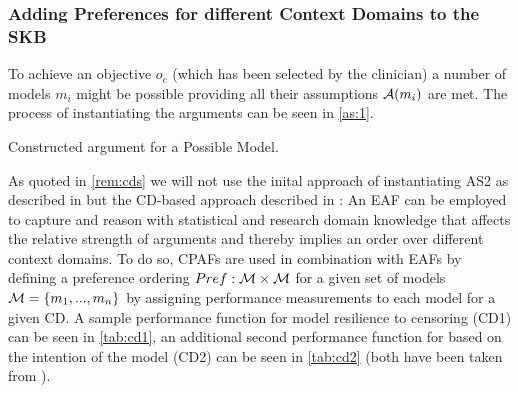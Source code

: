 \subsubsection{Adding Preferences for different Context Domains to the \gls{SKB}}
\label{sub:preferences}

To achieve an objective $o_c$ (which has been selected by the clinician) a number of models $m_i$ might be possible providing all their assumptions $\mathcal{A}(m_i)$ are met. The process of instantiating the arguments can be seen in \autoref{as:1}.

\begin{as}[h]
\centering
	\label{as:1}
	\caption{Constructed argument for a Possible Model.}
\end{as}

As quoted in \cref{rem:cds} we will not use the inital approach of instantiating AS2 as described in \cite{sassoon2014} but the \gls{CD}-based approach described in \cite{sassoon2016CD,sassoon2016}: An \gls{EAF} can be employed to capture and reason with statistical and research domain knowledge that affects the relative strength of arguments and thereby implies an order over different context domains. To do so, \glspl{CPAF} are used in combination with \glspl{EAF} by defining a preference ordering $Pref : \mathcal{M} \times \mathcal{M}$ for a given set of models $\mathcal{M} = \{m_1, ..., m_n\}$ by assigning performance measurements to each model for a given \gls{CD}. A sample performance function for model resilience to censoring (CD1) can be seen in \autoref{tab:cd1}, an additional second performance function for based on the intention of the model (CD2) can be seen in \autoref{tab:cd2} (both have been taken from \cite{sassoon2016CD}).


